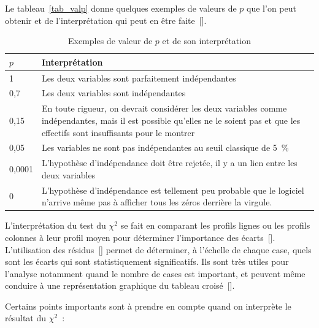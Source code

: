 \documentclass[a4paper,10pt,twoside,francais]{report}
\newcommand{\chid}{$\chi^2$\xspace}
\begin{document}
Le tableau~\vref{tab_valp} donne quelques exemples
de valeurs de $p$ que l'on peut obtenir et de l'interprétation qui
peut en être faite~[\pageref{ssec-valp}].

\begin{table}
  \begin{center}
    \begin{tabular}{lp{10cm}}
      \toprule
      $p$ & \textbf{Interprétation} \\
      \midrule
      1 & Les deux variables sont parfaitement indépendantes \\
      0,7 & Les deux variables sont indépendantes \\
      0,15 & En toute rigueur, on devrait considérer les deux variables
      comme indépendantes, mais il est possible qu'elles ne le soient
      pas et que les effectifs sont insuffisants pour le montrer \\
      0,05 & Les variables ne sont pas indépendantes au seuil classique de 5~\% \\
      0,0001 & L'hypothèse d'indépendance doit être rejetée, il y a un
      lien entre les deux variables \\
      0 & L'hypothèse d'indépendance est tellement peu probable que le
      logiciel n'arrive même pas à afficher tous les zéros derrière la
      virgule. \\
      \bottomrule
    \end{tabular}
    \caption{Exemples de valeur de $p$ et de son interprétation}
    \label{tab_valp}
  \end{center}
\end{table}

L'interprétation du test du \chid se fait en comparant les profils
lignes ou les profils colonnes à leur profil moyen pour déterminer
l'importance des écarts~[\pageref{ssec-sym}]. L'utilisation des
résidus~[\pageref{sec-residus}] permet de déterminer, à l'échelle de
chaque case, quels sont les écarts qui sont statistiquement
significatifs. Ils sont très utiles pour l'analyse notamment quand le
nombre de cases est important, et peuvent même conduire à une
représentation graphique du tableau croisé~[\pageref{fig_mosaic}].

Certains points importants sont à prendre en compte quand on
interprète le résultat du \chid~:
\end{document}
